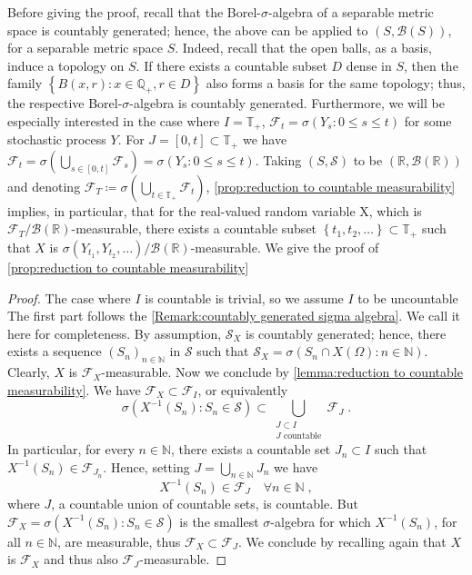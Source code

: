 \documentclass[11pt]{report}
\theoremstyle{plain} %
\theoremstyle{definition} %
\theoremstyle{remark} %
\begin{document}
 Before giving the proof, recall that the Borel-\(\sigma\)-algebra of a separable metric space is countably generated; hence, the above can be applied to \((S,\mathcal{B}(S))\), for a separable metric space \(S\). Indeed, recall that the open balls, as a basis, induce a topology on \(S\). If there exists a countable subset \(D\) dense in \(S\), then the family \(\left\{B(x,r):x\in \mathbb{Q}_+,r\in D\right\}\) also forms a basis for the same topology; thus, the respective Borel-\(\sigma\)-algebra is countably generated. Furthermore, we will be especially interested in the case where \(I=\mathbb{T}_+\), \(\mathcal{F}_t=\sigma(Y_s:0\leq s\leq t)\) for some stochastic process \(Y\). For \(J=[0,t]\subset\mathbb{T}_+\) we have \(\mathcal{F}_t=\sigma(\bigcup_{s\in[0,t]}\mathcal{F}_s)=\sigma(Y_s:0\leq s\leq t)\). Taking \((S,\mathcal{S})\) to be \((\mathbb{R},\mathcal{B}(\mathbb{R}))\) and denoting \(\mathcal{F}_{T}
 \coloneqq \sigma(\bigcup_{t\in\mathbb{T}_+}\mathcal{F}_t)\),  \cref{prop:reduction to countable measurability} implies, in particular, that for the real-valued random variable X, which is \(\mathcal{F}_{T}/\mathcal{B}(\mathbb{R})\)-measurable, there exists a countable subset \(\left\{t_1,t_2,\dots\right\}\subset\mathbb{T}_+\) such that \(X\) is \(\sigma(Y_{t_1},Y_{t_2},\dots)/\mathcal{B}(\mathbb{R})\)-measurable.
 \bigbreak
 We give the proof of \cref{prop:reduction to countable measurability}
 \begin{proof}
 The case where \(I\) is countable is trivial, so we assume \(I\) to be uncountable
 The first part follows the \cref{Remark:countably generated sigma algebra}. We call it here for completeness. By assumption, \(\mathcal{S}_X\) is countably generated; hence, there exists a sequence \((S_n)_{n\in\mathbb{N}}\) in \(\mathcal{S}\) such that \(\mathcal{S}_X=\sigma(S_n\cap X(\Omega):n\in\mathbb{N})\). 
 Clearly, \(X\) is \(\mathcal{F}_X\)-measurable. Now we conclude by \cref{lemma:reduction to countable measurability}. We have \(\mathcal{F}_X\subset\mathcal{F}_I\), or equivalently
 \begin{equation}
     \sigma(X^{-1}(S_n):S_n\in\mathcal{S})\subset\bigcup_{\substack{J\subset I\\ J\text{ countable}}}\mathcal{F}_J\;.
 \end{equation}
 In particular, for every \(n\in\mathbb{N}\), there exists a countable set \(J_n\subset I\) such that
 \(X^{-1}(S_n)\in \mathcal{F}_{J_n}\). Hence, setting \(J=\bigcup_{n\in\mathbb{N}}J_n\) we have 
 \begin{equation}
     X^{-1}(S_n)\in\mathcal{F}_J\quad\forall n\in\mathbb{N}\;,
 \end{equation}
 where \(J\), a countable union of countable sets, is countable.
 But \(\mathcal{F}_X=\sigma(X^{-1}(S_n):S_n\in\mathcal{S})\) is the smallest \(\sigma\)-algebra for which \(X^{-1}(S_n)\), for all \(n\in\mathbb{N}\), are measurable, thus \(\mathcal{F}_X\subset \mathcal{F}_J\). We conclude by recalling again that \(X\) is \(\mathcal{F}_X\) and thus also \(\mathcal{F}_J\)-measurable.
   \end{proof}
\end{document}
